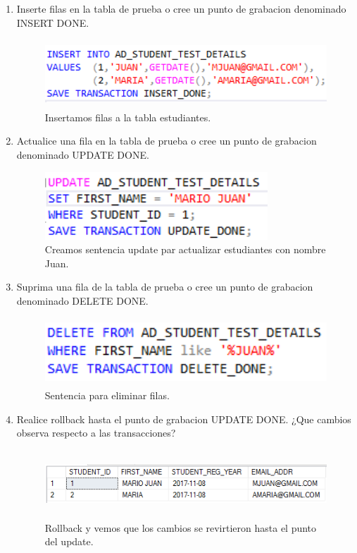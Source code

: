 \documentclass[12pt,letterpaper]{article}
\begin{document}
\begin{enumerate}[1.]
\begin{figure}[H]
\end{figure}
\item Inserte filas en la tabla de prueba o cree un punto de grabacion denominado INSERT DONE.
\begin{figure}[H]
	\centering
	\caption{Insertamos filas a la tabla estudiantes.}
	\includegraphics[height=1in]{./LeoImagen/PruebasBD_5.png} 
\end{figure}
\item Actualice una fila en la tabla de prueba o cree un punto de grabacion denominado UPDATE DONE.
\begin{figure}[H]
	\centering
	\caption{Creamos sentencia update par actualizar estudiantes con nombre Juan.}
	\includegraphics[height=1in]{./LeoImagen/PruebasBD_6.png} 
\end{figure}
\item Suprima una fila de la tabla de prueba o cree un punto de grabacion denominado DELETE DONE.
\begin{figure}[H]
	\centering
	\caption{Sentencia para eliminar filas.}
	\includegraphics[height=1in]{./LeoImagen/PruebasBD_7.png} 
\end{figure}
\item  Realice rollback hasta el punto de grabacion UPDATE DONE. ¿Que cambios observa respecto a las transacciones? \\
\begin{figure}[H]
	\centering
	\caption{Rollback y vemos que los cambios se revirtieron hasta el punto del update.}
	\includegraphics[height=1in]{./LeoImagen/PruebasBD_8.png} 
\end{figure}
\end{enumerate}
\end{document}
